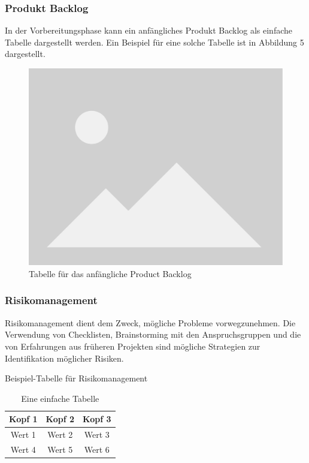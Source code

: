 \documentclass[main.tex]{subfiles} %
\begin{document}
\subsubsection{Produkt Backlog}

In der Vorbereitungsphase kann ein anfängliches Produkt Backlog als einfache Tabelle
dargestellt werden. Ein Beispiel für eine solche Tabelle ist in Abbildung 5 dargestellt.



\begin{figure}[h]
    \centering
    \includegraphics[width=0.7\linewidth]{img/placeholder.png}
    \caption{Tabelle für das anfängliche Product Backlog}
    \label{fig:backlog_table}
\end{figure}

\subsubsection{Risikomanagement}
Risikomanagement dient dem Zweck, mögliche Probleme vorwegzunehmen. Die Verwendung von
Checklisten, Brainstorming mit den Anspruchsgruppen und die von Erfahrungen
aus früheren Projekten sind mögliche Strategien zur Identifikation möglicher Risiken.

\begin{table}[h]
    \centering
    \caption{Beispiel-Tabelle für Risikomanagement}
    \begin{tabular}{|c|c|c|}
        \hline
        Kopf 1 & Kopf 2 & Kopf 3 \\
        \hline
        Wert 1 & Wert 2 & Wert 3 \\
        \hline
        Wert 4 & Wert 5 & Wert 6 \\
        \hline
    \end{tabular}
    \caption{Eine einfache Tabelle}
    \label{tab:meineTabelle}
\end{table}
\end{document}
